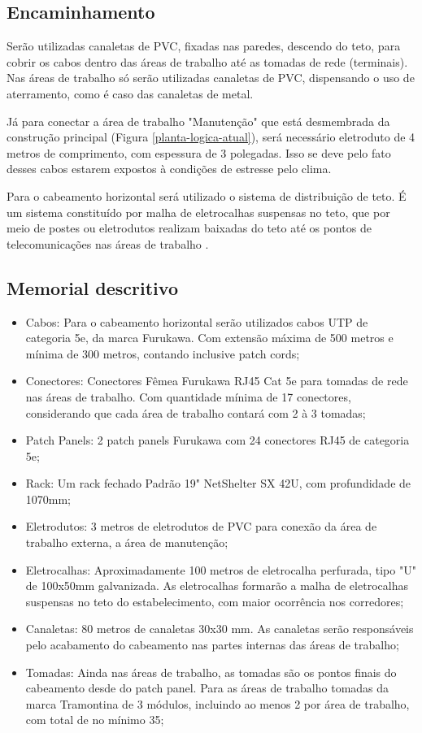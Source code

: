 \documentclass[	DIV=calc,%
							paper=a4,%
							fontsize=12pt,%
							onecolumn]{scrartcl}	 					%
\begin{document}
\subsection{Encaminhamento}

Serão utilizadas canaletas de PVC, fixadas nas paredes, descendo do teto, para cobrir os cabos dentro das áreas de trabalho até as tomadas de rede (terminais). Nas áreas de trabalho só serão utilizadas canaletas de PVC, dispensando o uso de aterramento, como é caso das canaletas de metal.

Já para conectar a área de trabalho "Manutenção" que está desmembrada da construção principal (Figura \ref{planta-logica-atual}), será necessário eletroduto de 4 metros de comprimento, com espessura de 3 polegadas. Isso se deve pelo fato desses cabos estarem expostos à condições de estresse pelo clima.

Para o cabeamento horizontal será utilizado o sistema de distribuição de teto. É um sistema constituído por malha de eletrocalhas suspensas no teto, que por meio de postes ou eletrodutos realizam baixadas do teto até os pontos de telecomunicações nas áreas de trabalho \cite{senai2012}.\newpage


\subsection{Memorial descritivo}

\begin{itemize}
	\item Cabos: Para o cabeamento horizontal serão utilizados cabos UTP de categoria 5e, da marca Furukawa. Com extensão máxima de 500 metros e mínima de 300 metros, contando inclusive patch cords;
	\item Conectores: Conectores Fêmea Furukawa RJ45 Cat 5e para tomadas de rede nas áreas de trabalho. Com quantidade mínima de 17 conectores, considerando que cada área de trabalho contará com 2 à 3 tomadas;
	\item Patch Panels: 2 patch panels Furukawa com 24 conectores RJ45 de categoria 5e;
	\item Rack: Um rack fechado Padrão 19" NetShelter SX 42U, com  profundidade de 1070mm;
	\item Eletrodutos: 3 metros de eletrodutos de PVC para conexão da área de trabalho externa, a área de manutenção; 
	\item Eletrocalhas: Aproximadamente 100 metros de eletrocalha perfurada, tipo "U" de 100x50mm galvanizada. As eletrocalhas formarão a  malha de eletrocalhas suspensas no teto do estabelecimento, com maior ocorrência nos corredores;
	\item Canaletas: 80 metros de canaletas 30x30 mm. As canaletas serão responsáveis pelo acabamento do cabeamento nas partes internas das áreas de trabalho;
	\item Tomadas: Ainda nas áreas de trabalho, as tomadas são os pontos finais do cabeamento desde do patch panel. Para as áreas de trabalho tomadas da marca Tramontina de 3 módulos, incluindo ao menos 2 por área de trabalho, com total de no mínimo 35;
\end{itemize}\newpage
\end{document}

